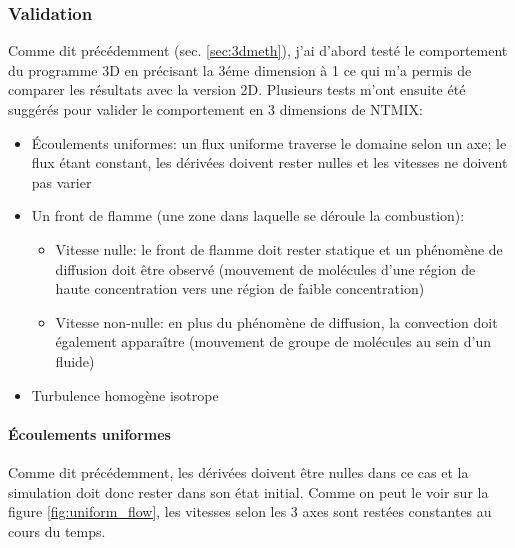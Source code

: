 
\subsubsection{Validation}\label{sec:3D-validation}
Comme dit précédemment (sec. \ref{sec:3dmeth}), j'ai d'abord testé le comportement du programme 3D en précisant la 3éme dimension à 1 ce qui m'a permis de comparer les résultats avec la version 2D. Plusieurs tests m'ont ensuite été suggérés pour valider le comportement en 3 dimensions de NTMIX:

\begin{itemize}
\item Écoulements uniformes: un flux uniforme traverse le domaine selon un axe; le flux étant constant, les dérivées doivent rester nulles et les vitesses ne doivent pas varier
\item Un front de flamme (une zone dans laquelle se déroule la combustion):
  \begin{itemize}
  \item Vitesse nulle: le front de flamme doit rester statique et un phénomène de diffusion doit être observé (mouvement de molécules d'une région de haute concentration vers une région de faible concentration)
  \item Vitesse non-nulle: en plus du phénomène de diffusion, la convection doit également apparaître (mouvement de groupe de molécules au sein d'un fluide)
  \end{itemize}
\item Turbulence homogène isotrope
\end{itemize}

\paragraph{Écoulements uniformes}
Comme dit précédemment, les dérivées doivent être nulles dans ce cas et la simulation doit donc rester dans son état initial. Comme on peut le voir sur la figure \ref{fig:uniform_flow}, les vitesses selon les 3 axes sont restées constantes au cours du temps.
 

